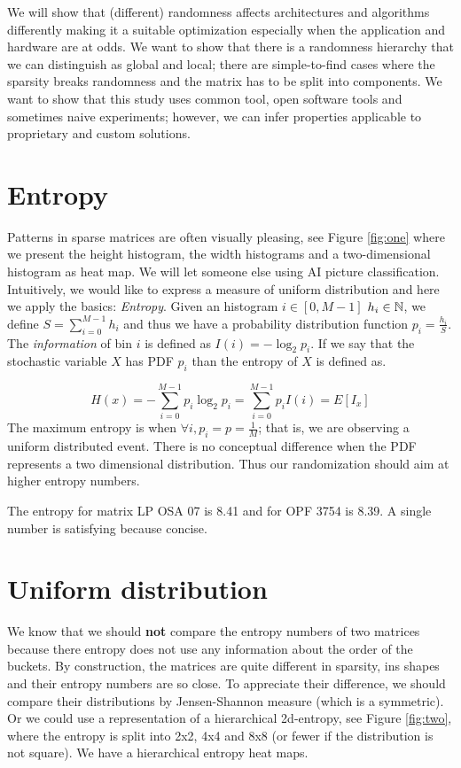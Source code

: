 \documentclass[manuscript,screen]{acmart}
\begin{document}
We will show that (different) randomness affects architectures and
algorithms differently making it a suitable optimization especially
when the application and hardware are at odds. We want to show that
there is a randomness hierarchy that we can distinguish as global and
local; there are simple-to-find cases where the sparsity breaks
randomness and the matrix has to be split into components.  We want to
show that this study uses common tool, open software tools and
sometimes naive experiments; however, we can infer properties
applicable to proprietary and custom solutions. 


\section{Entropy}
\label{sec:entropy}
Patterns in sparse matrices are often visually pleasing, see Figure
\ref{fig:one} where we present the height histogram, the width
histograms and a two-dimensional histogram as heat map. We will let
someone else using AI picture classification. Intuitively, we would
like to express a measure of uniform distribution and here we apply
the basics: {\em Entropy}. Given an histogram $i\in[0,M-1]$ $h_i \in
\mathbb{N}$, we define $S =\sum_{i=0}^{M-1}h_i$ and thus we have a probability
distribution function $p_i = \frac{h_i}{S}$. The {\em information} of
bin $i$ is defined as $I(i) = -\log_2 p_i$. If we say that the
stochastic variable $X$ has PDF $p_i$ than the entropy of $X$ is
defined as.

\begin{equation}
  \label{eq:entropy}
  H(x) = -\sum_{i=0}^{M-1} p_i\log_2p_i = \sum_{i=0}^{M-1}p_i I(i) =
  E[I_x]
\end{equation}
The maximum entropy is when $\forall i, p_i = p = \frac{1}{M}$; that
is, we are observing a uniform distributed event. There is no
conceptual difference when the PDF represents a two dimensional
distribution. Thus our randomization should aim at higher entropy
numbers.

The entropy for matrix LP OSA 07 is 8.41 and for OPF 3754 is 8.39. A
single number is satisfying because concise.  


\section{Uniform distribution}
\label{sec:uniform}
We know that we should {\bf not} compare the entropy numbers of two
matrices because there entropy does not use any information about the
order of the buckets. By construction, the matrices are quite
different in sparsity, ins shapes and their entropy numbers are so
close. To appreciate their difference, we should compare their
distributions by Jensen-Shannon measure (which is a symmetric). Or we
could use a representation of a hierarchical 2d-entropy, see Figure
\ref{fig:two}, where the entropy is split into 2x2, 4x4 and 8x8 (or
fewer if the distribution is not square). We have a hierarchical
entropy heat maps.
\end{document}
